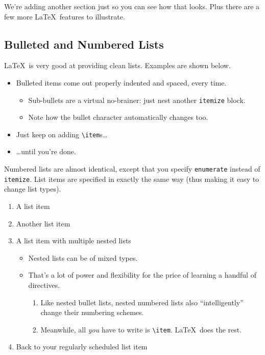 \documentclass{article}
\begin{document}
We're adding another section just so you can see how that looks.  Plus there are a few more \LaTeX\ features to illustrate.

\subsection{Bulleted and Numbered Lists}

\LaTeX\ is very good at providing clean lists.  Examples are shown below.

\begin{itemize}
\item Bulleted items come out properly indented and spaced, every time.

\begin{itemize}
\item Sub-bullets are a virtual no-brainer: just nest another \verb!itemize! block.
\item Note how the bullet character automatically changes too.
\end{itemize}

\item Just keep on adding \verb!\item!s\ldots

\item \ldots until you're done.
\end{itemize}

Numbered lists are almost identical, except that you specify \verb!enumerate! instead of \verb!itemize!.  List items are specified in exactly the same way (thus making it easy to change list types).

\begin{enumerate}
\item A list item
\item Another list item
\item A list item with multiple nested lists

\begin{itemize}
\item Nested lists can be of mixed types.
\item That's a lot of power and flexibility for the price of learning a handful of directives.

\begin{enumerate}
\item Like nested bullet lists, nested numbered lists also ``intelligently'' change their numbering schemes.
\item Meanwhile, all \emph{you} have to write is \verb!\item!.  \LaTeX\ does the rest.
\end{enumerate}
\end{itemize}

\item Back to your regularly scheduled list item

\end{enumerate}
\end{document}
